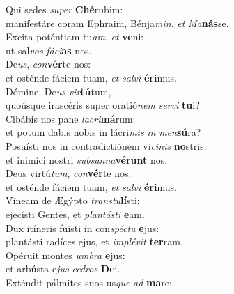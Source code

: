\evenverse Qui sedes \textit{su}\textit{per} \textbf{Ché}rubim:~\*\\
\evenverse manifestáre coram Ephraim, Bénja\textit{min}, \textit{et} \textit{Ma}\textbf{nás}se.\\
\oddverse Excita poténtiam tu\textit{am}, \textit{et} \textbf{ve}ni:~\*\\
\oddverse ut sal\textit{vos} \textit{fá}\textit{ci}\textbf{as} nos.\\
\evenverse De\textit{us}, \textit{con}\textbf{vér}te nos:~\*\\
\evenverse et osténde fáciem tuam, \textit{et} \textit{sal}\textit{vi} \textbf{é}\textbf{ri}mus.\\
\oddverse Dómine, De\textit{us} \textit{vir}\textbf{tú}tum,~\*\\
\oddverse quoúsque irascéris super oratió\textit{nem} \textit{ser}\textit{vi} \textbf{tu}i?\\
\evenverse Cibábis nos pane \textit{la}\textit{cri}\textbf{má}rum:~\*\\
\evenverse et potum dabis nobis in lácri\textit{mis} \textit{in} \textit{men}\textbf{sú}ra?\\
\oddverse Posuísti nos in contradictiónem vi\textit{cí}\textit{nis} \textbf{no}stris:~\*\\
\oddverse et inimíci nostri \textit{sub}\textit{san}\textit{na}\textbf{vé}\textbf{runt} nos.\\
\evenverse Deus virtú\textit{tum}, \textit{con}\textbf{vér}te nos:~\*\\
\evenverse et osténde fáciem tuam, \textit{et} \textit{sal}\textit{vi} \textbf{é}\textbf{ri}mus.\\
\oddverse Víneam de Ægýpto \textit{tran}\textit{stu}\textbf{lí}sti:~\*\\
\oddverse ejecísti Gentes, et \textit{plan}\textit{tá}\textit{sti} \textbf{e}am.\\
\evenverse Dux itíneris fuísti in con\textit{spé}\textit{ctu} \textbf{e}jus:~\*\\
\evenverse plantásti radíces ejus, et \textit{im}\textit{plé}\textit{vit} \textbf{ter}ram.\\
\oddverse Opéruit montes \textit{um}\textit{bra} \textbf{e}jus:~\*\\
\oddverse et arbústa e\textit{jus} \textit{ce}\textit{dros} \textbf{De}i.\\
\evenverse Exténdit pálmites suos us\textit{que} \textit{ad} \textbf{ma}re:~\*\\
